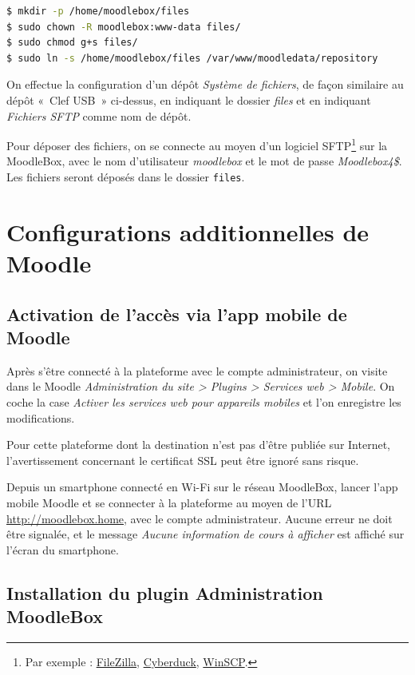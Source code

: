 \documentclass[11pt]{article}
\begin{document}
\begin{lstlisting}[language=bash]
$ mkdir -p /home/moodlebox/files
$ sudo chown -R moodlebox:www-data files/
$ sudo chmod g+s files/
$ sudo ln -s /home/moodlebox/files /var/www/moodledata/repository
\end{lstlisting}

On effectue la configuration d'un dépôt \emph{Système de fichiers}, de façon similaire au dépôt « Clef USB » ci-dessus, en indiquant le dossier \emph{files} et en indiquant \emph{Fichiers SFTP} comme nom de dépôt.

Pour déposer des fichiers, on se connecte au moyen d'un logiciel SFTP\footnote{Par exemple : \href{https://filezilla-project.org/}{FileZilla}, \href{https://cyberduck.io/}{Cyberduck}, \href{http://winscp.net/}{WinSCP}.} sur la MoodleBox, avec le nom d'utilisateur \emph{moodlebox} et le mot de passe \emph{Moodlebox4\$}. Les fichiers seront déposés dans le dossier \lstinline{files}.

\section{Configurations additionnelles de Moodle}

\subsection{Activation de l'accès via l'app mobile de Moodle}

Après s'être connecté à la plateforme avec le compte administrateur,  on visite dans le Moodle \emph{Administration du site > Plugins > Services web > Mobile}. On coche la case \emph{Activer les services web pour appareils mobiles} et l'on enregistre les modifications.

Pour cette plateforme dont la destination n'est pas d'être publiée sur Internet, l'avertissement concernant le certificat SSL peut être ignoré sans risque.

\begin{verification}
Depuis un smartphone connecté en Wi-Fi sur le réseau MoodleBox, lancer l'app mobile Moodle et se connecter à la plateforme au moyen de l'URL \url{http://moodlebox.home}, avec le compte administrateur. Aucune erreur ne doit être signalée, et le message \emph{Aucune information de cours à afficher} est affiché sur l'écran du smartphone.
\end{verification}

\subsection{Installation du plugin Administration MoodleBox}
\end{document}

